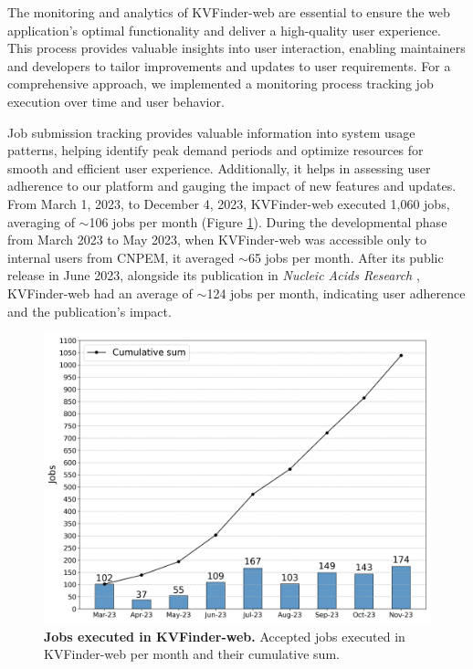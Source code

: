 \documentclass[Ingles]{phdthesis}
\begin{document}
The monitoring and analytics of KVFinder-web are essential to ensure the web application's optimal functionality and deliver a high-quality user experience. This process provides valuable insights into user interaction, enabling maintainers and developers to tailor improvements and updates to user requirements. For a comprehensive approach, we implemented a monitoring process tracking job execution over time and user behavior. 

Job submission tracking provides valuable information into system usage patterns, helping identify peak demand periods and optimize resources for smooth and efficient user experience. Additionally, it helps in assessing user adherence to our platform and gauging the impact of new features and updates. From March 1, 2023, to December 4, 2023, KVFinder-web executed 1,060 jobs, averaging of $\sim$106 jobs per month (Figure \ref{fig:job-execution}). During the developmental phase from March 2023 to May 2023, when KVFinder-web was accessible only to internal users from CNPEM, it averaged $\sim$65 jobs per month. After its public release in June 2023, alongside its publication in \textit{Nucleic Acids Research} \cite{guerra2023A}, KVFinder-web had an average of $\sim$124 jobs per month, indicating user adherence and the publication's impact.

\begin{figure}[h]
  \centering
  \includegraphics[scale=0.5]{images/jobs-executed-per-month.png}
  \caption[Jobs executed in KVFinder-web]{\textbf{Jobs executed in KVFinder-web.} Accepted jobs executed in KVFinder-web per month and their cumulative sum.}
  \label{fig:job-execution}
\end{figure}
\end{document}

